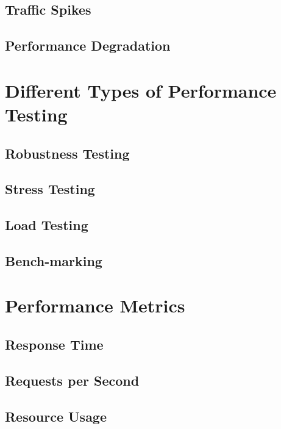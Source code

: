 \subsection{Traffic Spikes}

\subsection{Performance Degradation}

\section{Different Types of Performance Testing}
\label{Different Types of Performance Testing}

\subsection*{Robustness Testing}

\subsection*{Stress Testing}

\subsection*{Load Testing}

\subsection*{Bench-marking}

\section{Performance Metrics}
\label{Performance Metrics}

\subsection{Response Time}

\subsection{Requests per Second}

\subsection{Resource Usage}

